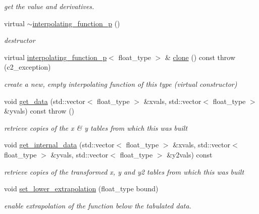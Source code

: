 \begin{DoxyCompactItemize}
\begin{DoxyCompactList}\small\item\em get the value and derivatives. \end{DoxyCompactList}\item 
virtual \hyperlink{classinterpolating__function__p_a24f78c2f0f5dc80cfbd87ada46d1367e}{$\sim$interpolating\+\_\+function\+\_\+p} ()
\begin{DoxyCompactList}\small\item\em destructor \end{DoxyCompactList}\item 
virtual \hyperlink{classinterpolating__function__p}{interpolating\+\_\+function\+\_\+p}$<$ float\+\_\+type $>$ \& \hyperlink{classinterpolating__function__p_a8a2c601fde0ef3226e51d1f51b4f5f2f}{clone} () const   throw (c2\+\_\+exception)
\begin{DoxyCompactList}\small\item\em create a new, empty interpolating function of this type (virtual constructor) \end{DoxyCompactList}\item 
void \hyperlink{classinterpolating__function__p_a93652fb1b325f38c9a0c0101f6064ee4}{get\+\_\+data} (std\+::vector$<$ float\+\_\+type $>$ \&xvals, std\+::vector$<$ float\+\_\+type $>$ \&yvals) const   throw ()
\begin{DoxyCompactList}\small\item\em retrieve copies of the x \& y tables from which this was built \end{DoxyCompactList}\item 
void \hyperlink{classinterpolating__function__p_aefc83ca152cbefa5fc9278b26b5b2aee}{get\+\_\+internal\+\_\+data} (std\+::vector$<$ float\+\_\+type $>$ \&xvals, std\+::vector$<$ float\+\_\+type $>$ \&yvals, std\+::vector$<$ float\+\_\+type $>$ \&y2vals) const 
\begin{DoxyCompactList}\small\item\em retrieve copies of the transformed x, y and y2 tables from which this was built \end{DoxyCompactList}\item 
void \hyperlink{classinterpolating__function__p_a2c3f8e1552a4d7ff43361baef34d5ae5}{set\+\_\+lower\+\_\+extrapolation} (float\+\_\+type bound)
\begin{DoxyCompactList}\small\item\em enable extrapolation of the function below the tabulated data. \end{DoxyCompactList}\item 

\end{DoxyCompactItemize}

